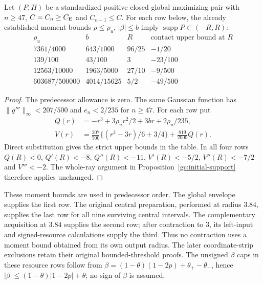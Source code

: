 \begin{corollary}\label{gc:tail-support}
Let $(P,H)$ be a standardized positive closed global maximizing pair
with $n\ge47$, $C=C_n\ge C_{\mathrm E}$ and $C_{n-1}\le C$.
For each row below, the already established moment bounds
$\rho\le\rho_u$, $|\beta|\le b$ imply
$\operatorname{supp}P\subset(-R,R)$:
\[
\begin{array}{c|c|c|c}
 \rho_u&b&R&\text{contact upper bound at }R\\\hline
 7361/4000&643/1000&96/25&-1/20\\
 139/100&43/100&3&-23/100\\
 12563/10000&1963/5000&27/10&-9/500\\
 603687/500000&4014/15625&5/2&-49/500
\end{array}
\]
\end{corollary}
\begin{proof}
The predecessor allowance is zero. The same Gaussian function has
$\|g'''\|_\infty<207/500$ and $e_n<2/235$ for $n\ge47$.
For each row put
\begin{align*}
 Q(r)&=-r^3+3\rho_ur^2/2+3br+2\rho_u/235,\\
 V(r)&=\frac{207}{500}\{(r^3-3r)/6+3/4\}
       +\frac{819}{2000}Q(r).
\end{align*}
Direct substitution gives the strict upper bounds in the table.
In all four rows $Q(R)<0$, $Q'(R)<-8$, $Q''(R)<-11$,
$V'(R)<-5/2$, $V''(R)<-7/2$ and $V'''<-2$.
The whole-ray argument in Proposition~\ref{gc:initial-support}
therefore applies unchanged.
\end{proof}

These moment bounds are used in predecessor order. The global envelope
supplies the first row. The original central preparation, performed
at radius $3.84$, supplies the last row for all nine surviving central
intervals. The complementary acquisition at $3.84$ supplies the second
row; after contraction to $3$, its left-input and signed-resource
calculations supply the third. Thus no contraction uses a moment
bound obtained from its own output radius. The later coordinate-strip
exclusions retain their original bounded-threshold proofs.
The unsigned $\beta$ caps in these resource rows follow from
$\beta=(1-\theta)(1-2p)+\theta_+-\theta_-$, hence
$|\beta|\le(1-\theta)|1-2p|+\theta$; no sign of $\beta$ is assumed.
